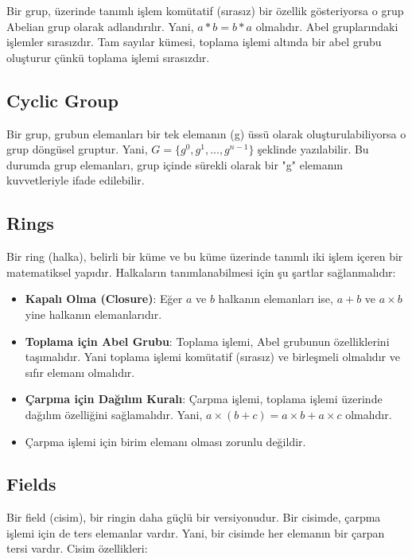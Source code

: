 Bir grup, üzerinde tanımlı işlem komütatif (sırasız) bir özellik gösteriyorsa o grup Abelian grup olarak adlandırılır. Yani, $a * b = b * a$ olmalıdır. Abel gruplarındaki işlemler sırasızdır. Tam sayılar kümesi, toplama işlemi altında bir abel grubu oluşturur çünkü toplama işlemi sırasızdır.

\newpage

\subsection{Cyclic Group}

Bir grup, grubun elemanları bir tek elemanın (g) üssü olarak oluşturulabiliyorsa o grup döngüsel gruptur. Yani, $G = \{ g^0, g^1, ..., g^{n-1} \}$ şeklinde yazılabilir. Bu durumda grup elemanları, grup içinde sürekli olarak bir "g" elemanın kuvvetleriyle ifade edilebilir.

\newpage

\subsection{Rings}

Bir ring (halka), belirli bir küme ve bu küme üzerinde tanımlı iki işlem içeren bir matematiksel yapıdır. Halkaların tanımlanabilmesi için şu şartlar sağlanmalıdır:

\begin{itemize}
    \item \textbf{Kapalı Olma (Closure)}: Eğer $a$ ve $b$ halkanın elemanları ise, $a + b$ ve $a \times b$ yine halkanın elemanlarıdır.
    \item \textbf{Toplama için Abel Grubu}: Toplama işlemi, Abel grubunun özelliklerini taşımalıdır. Yani toplama işlemi komütatif (sırasız) ve birleşmeli olmalıdır ve sıfır elemanı olmalıdır.
    \item \textbf{Çarpma için Dağılım Kuralı}: Çarpma işlemi, toplama işlemi üzerinde dağılım özelliğini sağlamalıdır. Yani, $a \times (b + c) = a \times b + a \times c$ olmalıdır.
    \item Çarpma işlemi için birim elemanı olması zorunlu değildir.
\end{itemize}

\newpage

\subsection{Fields}

Bir field (cisim), bir ringin daha güçlü bir versiyonudur. Bir cisimde, çarpma işlemi için de ters elemanlar vardır. Yani, bir cisimde her elemanın bir çarpan tersi vardır. Cisim özellikleri:

